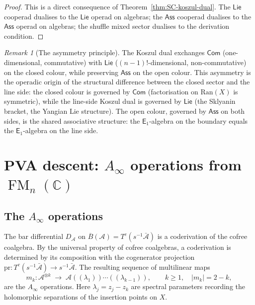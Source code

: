 \documentclass[11pt,reqno]{amsart}
\theoremstyle{definition}
\theoremstyle{remark}
\newtheorem{remark}[theorem]{Remark}
\newcommand{\cA}{\mathcal{A}}
\newcommand{\CC}{\mathbb{C}}
\newcommand{\Ran}{\mathrm{Ran}}
\newcommand{\barB}{\overline{B}}
\newcommand{\barA}{\bar{\cA}}
\newcommand{\Ainf}{A_{\infty}}
\newcommand{\Eone}{\mathsf{E}_{1}}
\newcommand{\Ass}{\mathsf{Ass}}
\newcommand{\Com}{\mathsf{Com}}
\newcommand{\Lie}{\mathsf{Lie}}
\DeclareMathOperator{\FM}{FM}
\numberwithin{equation}{section}
\begin{document}
\begin{proof}
This is a direct consequence of
Theorem~\ref{thm:SC-koszul-dual}.  The $\Lie$ cooperad
dualises to the $\Lie$ operad on algebras; the $\Ass$ cooperad
dualises to the $\Ass$ operad on algebras; the shuffle mixed
sector dualises to the derivation condition.
\end{proof}

\begin{remark}[The asymmetry principle]
\label{rem:asymmetry}
The Koszul dual exchanges $\Com$ (one-dimensional, commutative)
with $\Lie$ ($(n-1)!$-dimensional, non-commutative) on the closed
colour, while preserving $\Ass$ on the open colour.  This
asymmetry is the operadic origin of the structural difference
between the closed sector and the line side: the closed colour is governed by
$\Com$ (factorisation on $\Ran(X)$ is symmetric), while the
line-side Koszul dual is governed by $\Lie$ (the Sklyanin
bracket, the Yangian Lie structure).  The open colour, governed
by $\Ass$ on both sides, is the shared associative structure:
the $\Eone$-algebra on the boundary equals the $\Eone$-algebra
on the line side.
\end{remark}


\section{PVA descent: $\Ainf$ operations from $\FM_n(\CC)$}
\label{sec:pva-descent}

\subsection{The $\Ainf$ operations}

The bar differential $D_\cA$ on
$\barB(\cA) = T^c(s^{-1}\barA)$ is a coderivation of the cofree
coalgebra.  By the universal property of cofree coalgebras, a
coderivation is determined by its composition with the
cogenerator projection
$\mathrm{pr} \colon T^c(s^{-1}\barA) \to s^{-1}\barA$.
The resulting sequence of multilinear maps
\begin{equation}\label{eq:Ainf-ops}
  m_k \colon \cA^{\otimes k}
  \;\longrightarrow\;
  \cA((\lambda_1)) \cdots ((\lambda_{k-1})),
  \qquad k \geq 1, \quad |m_k| = 2-k,
\end{equation}
are the $\Ainf$ operations.  Here $\lambda_j = z_j - z_k$ are
spectral parameters recording the holomorphic separations of
the insertion points on $X$.
\end{document}
